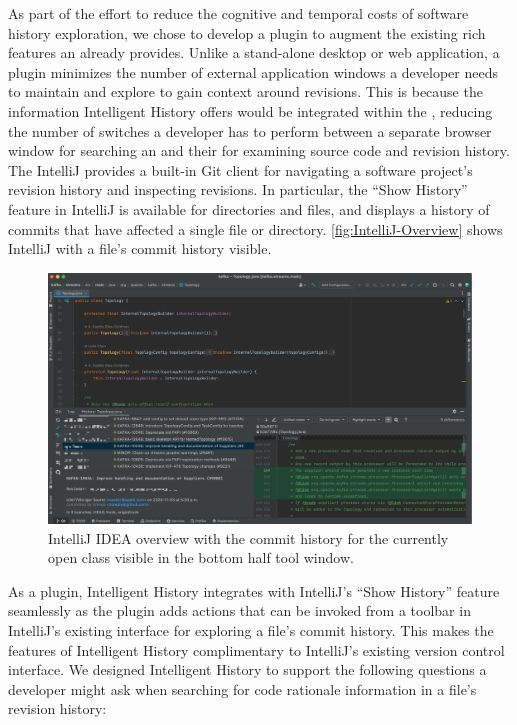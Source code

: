 As part of the effort to reduce the cognitive and temporal costs of software history exploration, we chose to develop a plugin to augment the existing rich features an  already provides.
Unlike a stand-alone desktop or web application, a plugin minimizes the number of external application windows a developer needs to maintain and explore to gain context around revisions. 
This is because the information Intelligent History offers would be integrated within the , reducing the number of switches a developer has to perform between a separate browser window for searching an  and their  for examining source code and revision history.
The IntelliJ  provides a built-in Git client  for navigating a software project's revision history and inspecting revisions. 
In particular, the ``Show History'' feature in IntelliJ is available for directories and files, and displays a history of commits that have affected a single file or directory.
\autoref{fig:IntelliJ-Overview} shows IntelliJ with a file's commit history visible.

\begin{figure}[ht]
    \includegraphics[width=\textwidth]{./images/intellij-overview.png}
    \caption{
        IntelliJ IDEA overview with the commit history for the currently open  class visible in the bottom half tool window.
    }
    \label{fig:IntelliJ-Overview}
\end{figure}

As a plugin, Intelligent History integrates with IntelliJ's ``Show History'' feature seamlessly as the plugin adds actions that can be invoked from a toolbar in IntelliJ's existing interface for exploring a file's commit history. 
This makes the features of Intelligent History complimentary to IntelliJ's existing version control interface.
We designed Intelligent History to support the following questions a developer might ask when searching for code rationale information in a file's revision history:

